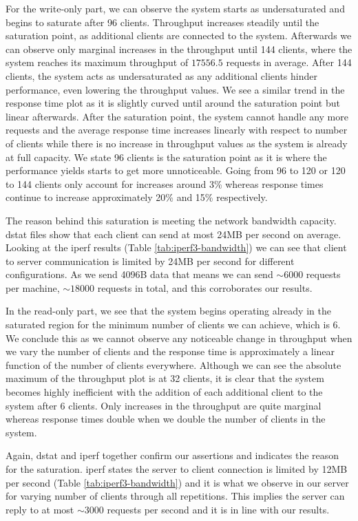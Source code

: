 \documentclass[11pt,a4paper]{article}
\begin{document}
\par For the write-only part, we can observe the system starts as undersaturated and begins to saturate after 96 clients. Throughput increases steadily until the saturation point, as additional clients are connected to the system. Afterwards we can observe only marginal increases in the throughput until 144 clients, where the system reaches its maximum throughput of $17556.5$ requests in average. After 144 clients, the system acts as undersaturated as any additional clients hinder performance, even lowering the throughput values. We see a similar trend in the response time plot as it is slightly curved until around the saturation point but linear afterwards. After the saturation point, the system cannot handle any more requests and the average response time increases linearly with respect to number of clients while there is no increase in throughput values as the system is already at full capacity. We state 96 clients is the saturation point as it is where the performance yields starts to get more unnoticeable. Going from 96 to 120 or 120 to 144 clients only account for increases around 3\% whereas response times continue to increase approximately 20\% and 15\% respectively.
\par The reason behind this saturation is meeting the network bandwidth capacity. dstat files show that each client can send at most 24MB per second on average. Looking at the iperf results (Table \ref{tab:iperf3-bandwidth}) we can see that client to server communication is limited by 24MB per second for different configurations. As we send 4096B data that means we can send $\sim 6000$ requests per machine, $\sim 18000$ requests in total, and this corroborates our results.

\par In the read-only part, we see that the system begins operating already in the saturated region for the minimum number of clients we can achieve, which is 6. We conclude this as we cannot observe any noticeable change in throughput when we vary the number of clients and the response time is approximately a linear function of the number of clients everywhere. Although we can see the absolute maximum of the throughput plot is at 32 clients, it is clear that the system becomes highly inefficient with the addition of each additional client to the system after 6 clients. Only increases in the throughput are quite marginal whereas response times double when we double the number of clients in the system.
\par Again, dstat and iperf together confirm our assertions and indicates the reason for the saturation. iperf states the server to client connection is limited by 12MB per second (Table \ref{tab:iperf3-bandwidth}) and it is what we observe in our server for varying number of clients through all repetitions. This implies the server can reply to at most $\sim 3000$ requests per second and it is in line with our results.
\end{document}
